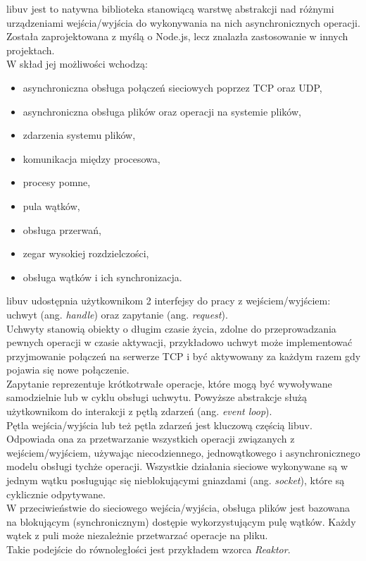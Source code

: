 \documentclass[12pt,twoside]{article}
\providecommand{\tightlist}{  \setlength{\itemsep}{0pt}\setlength{\parskip}{0pt}}
\begin{document}
libuv jest to natywna biblioteka stanowiącą warstwę abstrakcji nad
różnymi urządzeniami wejścia/wyjścia do wykonywania na nich
asynchronicznych operacji. Została zaprojektowana z myślą o Node.js,
lecz znalazła zastosowanie w innych projektach.\\
W skład jej możliwości wchodzą:

\begin{itemize}
\tightlist
\item
  asynchroniczna obsługa połączeń sieciowych poprzez TCP oraz UDP,
\item
  asynchroniczna obsługa plików oraz operacji na systemie plików,
\item
  zdarzenia systemu plików,
\item
  komunikacja między procesowa,
\item
  procesy pomne,
\item
  pula wątków,
\item
  obsługa przerwań,
\item
  zegar wysokiej rozdzielczości,
\item
  obsługa wątków i ich synchronizacja.
\end{itemize}

libuv udostępnia użytkownikom 2 interfejsy do pracy z wejściem/wyjściem:
uchwyt (ang. \emph{handle}) oraz zapytanie (ang. \emph{request}).\\
Uchwyty stanowią obiekty o długim czasie życia, zdolne do
przeprowadzania pewnych operacji w czasie aktywacji, przykładowo uchwyt
może implementować przyjmowanie połączeń na serwerze TCP i być
aktywowany za każdym razem gdy pojawia się nowe połączenie.\\
Zapytanie reprezentuje krótkotrwałe operacje, które mogą być wywoływane
samodzielnie lub w cyklu obsługi uchwytu. Powyższe abstrakcje służą
użytkownikom do interakcji z pętlą zdarzeń (ang. \emph{event loop}).\\
Pętla wejścia/wyjścia lub też pętla zdarzeń jest kluczową częścią libuv.
Odpowiada ona za przetwarzanie wszystkich operacji związanych z
wejściem/wyjściem, używając niecodziennego, jednowątkowego i
asynchronicznego modelu obsługi tychże operacji. Wszystkie działania
sieciowe wykonywane są w jednym wątku posługując się nieblokującymi
gniazdami (ang. \emph{socket}), które są cyklicznie odpytywane.\\
W przeciwieństwie do sieciowego wejścia/wyjścia, obsługa plików jest
bazowana na blokującym (synchronicznym) dostępie wykorzystującym pulę
wątków. Każdy wątek z puli może niezależnie przetwarzać operacje na
pliku.\\
Takie podejście do równoległości jest przykładem wzorca \emph{Reaktor}.
\end{document}

